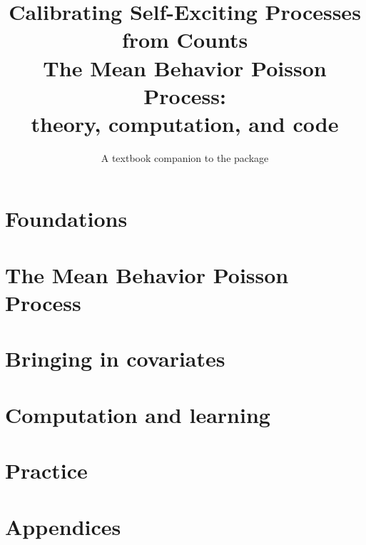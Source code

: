 \documentclass[11pt,openany]{book}
\title{\Huge\bfseries Calibrating Self-Exciting Processes\\ from Counts\\[10pt]
\Large The Mean Behavior Poisson Process:\\ theory, computation, and code}
\author{\large A textbook companion to the \code{hawkes\_calibration} package}
\date{}
\theoremstyle{plain}
\theoremstyle{definition}
\theoremstyle{remark}
\newcounter{exc}[chapter]
\begin{document}
\frontmatter
\maketitle
\tableofcontents


\mainmatter
\part{Foundations}




\part{The Mean Behavior Poisson Process}






\part{Bringing in covariates}




\part{Computation and learning}



\part{Practice}


\appendix
\part{Appendices}




\end{document}
